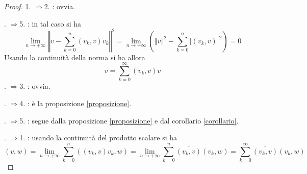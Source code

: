 \documentclass[a4paper,11pt]{book}
\newcommand{\norm}[1]{\left\Vert#1\right\Vert}
\theoremstyle{theorem}
\theoremstyle{definition}
\begin{document}
\begin{proof}
	1. $\Rightarrow$2. : ovvia.
	
	. $\Rightarrow$5. : in tal caso si ha
	\[\lim\limits_{n\to+\infty}\norm{v-\sum_{k=0}^{n}(v_k,v)v_k}^2=\lim\limits_{n\to+\infty}\left(\norm{v}^2-\sum_{k=0}^{n}|(v_k,v)|^2\right)=0\]
	Usando la continuità della norma si ha allora
	\[v=\sum_{k=0}^{\infty}(v_k,v)v\]
	. $\Rightarrow$3. : ovvia.
	
	. $\Rightarrow$4. : è la proposizione  \ref{proposizione}.
	
	. $\Rightarrow$5. : segue dalla proposizione \ref{proposizione} e dal corollario \ref{corollario}.
	
	. $\Rightarrow$1. : usando la continuità del prodotto scalare si ha
	\[(v,w)=\lim\limits_{n\to+\infty}\sum_{k=0}^{n}((v_k,v)v_k,w)=\lim\limits_{n\to+\infty}\sum_{k=0}^{n}\overline{(v_k,v)}(v_k,w)=\sum_{k=0}^{\infty}\overline{(v_k,v)}(v_k,w)\]
	
\end{proof}
\end{document}

